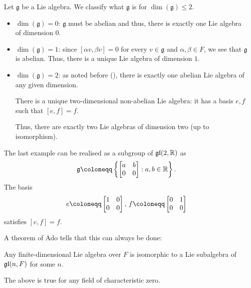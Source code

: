 \documentclass[12pt]{article}
\begin{document}
\begin{ex} \label{ex:lie-algebras-small-dimension}
	Let $\mathfrak{g}$ be a Lie algebra. We classify what $\mathfrak{g}$ is for $\dim(\mathfrak{g}) \le 2$.
	\begin{itemize}
		\item $\dim(\mathfrak{g}) = 0$: $\mathfrak{g}$ must be abelian and thus, there is exactly one Lie algebra of dimension $0$.
		\item $\dim(\mathfrak{g}) = 1$: since $[\alpha v, \beta v] = 0$ for every $v \in \mathfrak{g}$ and $\alpha, \beta \in F$, we see that $\mathfrak{g}$ is abelian. Thus, there is a unique Lie algebra of dimension $1$.
		\item $\dim(\mathfrak{g}) = 2$: as noted before (), there is exactly one abelian Lie algebra of any given dimension. 

		There is a unique two-dimensional non-abelian Lie algebra: it has a basis $e, f$ such that $[e, f] = f$.

		Thus, there are exactly two Lie algebras of dimension two (up to isomorphism).
	\end{itemize}
\end{ex}

\begin{ex}
	The last example can be realised as a subgroup of $\mathfrak{gl}(2, \mathbb{R})$ as
	\begin{equation*} 
		\mathfrak{g} \coloneqq \left\{\two{a}{b}{0}{0} : a, b \in \mathbb{R}\right\}.
	\end{equation*}
	The basis 
	\begin{equation*} 
		e \coloneqq \two{1}{0}{0}{0},\, f \coloneqq \two{0}{1}{0}{0}
	\end{equation*}
	satisfies $[e, f] = f$.
\end{ex}

A theorem of Ado tells that this can always be done:
\begin{thm}[Ado]
	Any finite-dimensional Lie algebra over $F$ is isomorphic to a Lie subalgebra of $\mathfrak{gl}(n, F)$ for some $n$.
\end{thm}
The above is true for any field of characteristic zero.
\end{document}
